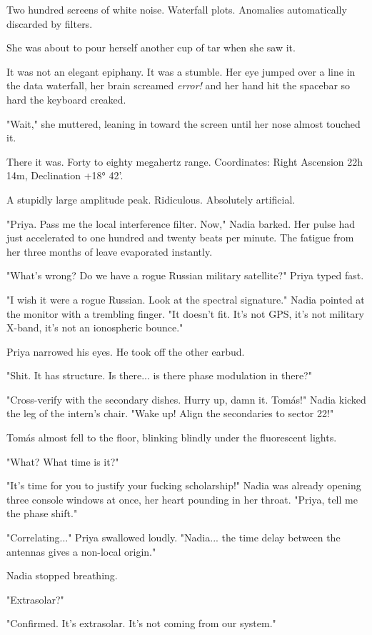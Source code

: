 \documentclass[11pt,a5paper,twoside]{book}
\begin{document}
Two hundred screens of white noise. Waterfall plots. Anomalies automatically discarded by filters.

She was about to pour herself another cup of tar when she saw it.

It was not an elegant epiphany. It was a stumble. Her eye jumped over a line in the data waterfall, her brain screamed \textit{error!} and her hand hit the spacebar so hard the keyboard creaked.

"Wait," she muttered, leaning in toward the screen until her nose almost touched it.

There it was. Forty to eighty megahertz range. Coordinates: Right Ascension 22h 14m, Declination +18° 42'.

A stupidly large amplitude peak. Ridiculous. Absolutely artificial.

"Priya. Pass me the local interference filter. Now," Nadia barked. Her pulse had just accelerated to one hundred and twenty beats per minute. The fatigue from her three months of leave evaporated instantly.

"What's wrong? Do we have a rogue Russian military satellite?" Priya typed fast.

"I wish it were a rogue Russian. Look at the spectral signature." Nadia pointed at the monitor with a trembling finger. "It doesn't fit. It's not GPS, it's not military X-band, it's not an ionospheric bounce."

Priya narrowed his eyes. He took off the other earbud.

"Shit. It has structure. Is there... is there phase modulation in there?"

"Cross-verify with the secondary dishes. Hurry up, damn it. Tomás!" Nadia kicked the leg of the intern's chair. "Wake up! Align the secondaries to sector 22!"

Tomás almost fell to the floor, blinking blindly under the fluorescent lights.

"What? What time is it?"

"It's time for you to justify your fucking scholarship!" Nadia was already opening three console windows at once, her heart pounding in her throat. "Priya, tell me the phase shift."

"Correlating..." Priya swallowed loudly. "Nadia... the time delay between the antennas gives a non-local origin."

Nadia stopped breathing.

"Extrasolar?"

"Confirmed. It's extrasolar. It's not coming from our system."
\end{document}
